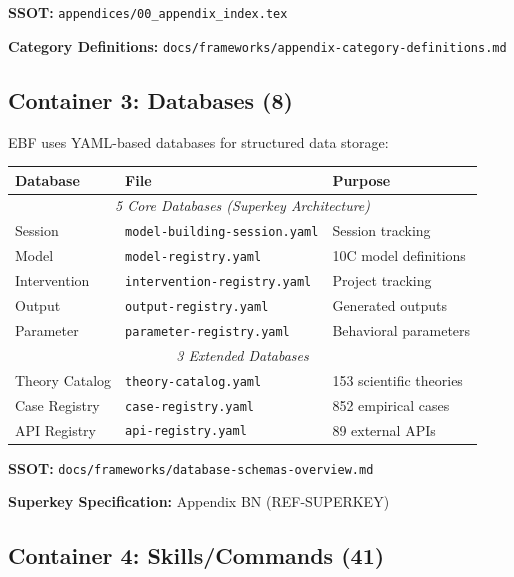 \textbf{SSOT:} \texttt{appendices/00\_appendix\_index.tex}

\textbf{Category Definitions:} \texttt{docs/frameworks/appendix-category-definitions.md}


\subsection{Container 3: Databases (8)}
\label{sec:bo-databases}

EBF uses YAML-based databases for structured data storage:

\begin{center}
\begin{tabular}{|l|l|l|}
\hline
\textbf{Database} & \textbf{File} & \textbf{Purpose} \\
\hline
\multicolumn{3}{|c|}{\textit{5 Core Databases (Superkey Architecture)}} \\
\hline
Session & \texttt{model-building-session.yaml} & Session tracking \\
Model & \texttt{model-registry.yaml} & 10C model definitions \\
Intervention & \texttt{intervention-registry.yaml} & Project tracking \\
Output & \texttt{output-registry.yaml} & Generated outputs \\
Parameter & \texttt{parameter-registry.yaml} & Behavioral parameters \\
\hline
\multicolumn{3}{|c|}{\textit{3 Extended Databases}} \\
\hline
Theory Catalog & \texttt{theory-catalog.yaml} & 153 scientific theories \\
Case Registry & \texttt{case-registry.yaml} & 852 empirical cases \\
API Registry & \texttt{api-registry.yaml} & 89 external APIs \\
\hline
\end{tabular}
\end{center}

\textbf{SSOT:} \texttt{docs/frameworks/database-schemas-overview.md}

\textbf{Superkey Specification:} Appendix BN (REF-SUPERKEY)


\subsection{Container 4: Skills/Commands (41)}
\label{sec:bo-skills}

